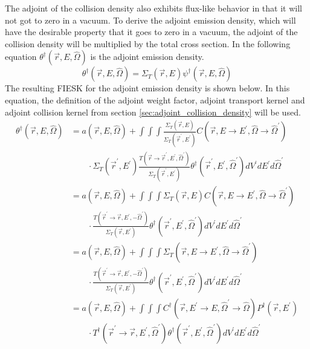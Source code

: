 The adjoint of the collision density also exhibits flux-like behavior in that
it will not got to zero in a vacuum. To derive the adjoint emission density,
which will have the desirable property that it goes to zero in a vacuum, the
adjoint of the collision density will be multiplied by the total cross section.
In the following equation $\theta^{\dagger}(\vec{r},E,\hat{\Omega})$ is the
adjoint emission density.
\begin{equation}
  \theta^{\dagger}(\vec{r},E,\hat{\Omega}) = \Sigma_T(\vec{r},E)
  \psi^{\dagger}(\vec{r},E,\hat{\Omega})
  \label{eq:adj_emission_dens_to_adj_of_collision_dens}
\end{equation}
The resulting FIESK for the adjoint emission density is shown below. In this
equation, the definition of the adjoint weight factor, adjoint transport 
kernel and adjoint collision kernel from section 
\ref{sec:adjoint_collision_density} will be used.
\begin{align}
  \theta^{\dagger}(\vec{r},E,\hat{\Omega}) & = a(\vec{r},E,\hat{\Omega}) + 
  \int\int\int \frac{\Sigma_T(\vec{r},E)}{\Sigma_T(\vec{r}^{'},E^{'})}
  C(\vec{r},E \to E^{'},\hat{\Omega} \to \hat{\Omega}^{'}) \nonumber \\
    & \qquad \cdot \Sigma_T(\vec{r}^{'},E^{'})
  \frac{T(\vec{r} \to \vec{r}^{'},E^{'},\hat{\Omega}^{'})}
       {\Sigma_T(\vec{r}^{'},E^{'})}
  \theta^{\dagger}(\vec{r}^{'},E^{'},\hat{\Omega}^{'}) dV^{'}dE^{'}d\hat{\Omega}^{'}
  \nonumber \\
  & = a(\vec{r},E,\hat{\Omega}) + 
  \int\int\int \Sigma_T(\vec{r},E) 
  C(\vec{r},E \to E^{'},\hat{\Omega} \to \hat{\Omega}^{'}) \nonumber \\
  & \qquad \cdot \frac{T(\vec{r}^{'} \to \vec{r},E^{'},-\hat{\Omega}^{'})}
                      {\Sigma_T(\vec{r},E^{'})}
  \theta^{\dagger}(\vec{r}^{'},E^{'},\hat{\Omega}^{'}) dV^{'}dE^{'}d\hat{\Omega}^{'}
  \nonumber \\
  & = a(\vec{r},E,\hat{\Omega}) + 
  \int\int\int \Sigma_T(\vec{r},E \to E^{'},\hat{\Omega} \to \hat{\Omega}^{'}) 
  \nonumber \\
  & \qquad \cdot \frac{T(\vec{r}^{'} \to \vec{r},E^{'},-\hat{\Omega}^{'})}
           {\Sigma_T(\vec{r},E^{'})}
    \theta^{\dagger}(\vec{r}^{'},E^{'},\hat{\Omega}^{'}) dV^{'}dE^{'}d\hat{\Omega}^{'}
  \nonumber \\
  & = a(\vec{r},E,\hat{\Omega}) +
  \int\int\int 
  C^{\dagger}(\vec{r},E^{'} \to E,\hat{\Omega}^{'} \to \hat{\Omega})
  P^{\dagger}(\vec{r},E^{'}) \nonumber \\
  & \qquad \cdot 
  T^{\dagger}(\vec{r}^{'} \to \vec{r},E^{'},\hat{\Omega}^{'})
  \theta^{\dagger}(\vec{r}^{'},E^{'},\hat{\Omega}^{'}) dV^{'}dE^{'}d\hat{\Omega}^{'}
  \nonumber 
\end{align}

